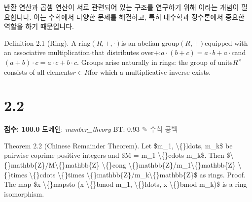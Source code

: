 \documentclass[11pt,a4paper,oneside]{memoir}
\begin{document}
\begin{tcolorbox}[kostyle]
\begin{motivation}
반환 연산과 곱셈 연산이 서로 관련되어 있는 구조를 연구하기 위해 이라는 개념이 필요합니다. 이는 수학에서 다양한 문제를 해결하고, 특히 대수학과 정수론에서 중요한 역할을 하기 때문입니다.
\end{motivation}

Definition 2.1 (Ring). A ring$(R, +, \cdot)$is an abelian group$(R, +)$equipped with an associative multiplication$\cdot$that distributes over$+$:$a \cdot (b + c) = a \cdot b + a \cdot c$and$(a + b) \cdot c = a \cdot c + b \cdot c$. Groups arise naturally in rings: the group of units$R^{\times}$consists of all elements$r \in R$for which a multiplicative inverse exists.


\end{tcolorbox}
\vspace{0.8em}

\section{2.2}
\noindent \textbf{\color{ScoreGreen}점수: 100.0} \quad 도메인: \textit{number\_theory}  \quad \textcolor{ScoreGreen}{BT: 0.93} \quad \textcolor{gray}{\small ✎ 수식 공백}
\vspace{0.4em}

\begin{tcolorbox}[origstyle]
\small Theorem 2.2 (Chinese Remainder Theorem). Let \$m\_1, \textbackslash\{\}ldots, m\_k\$ be pairwise coprime positive integers and \$M = m\_1 \textbackslash\{\}cdots m\_k\$. Then \$\textbackslash\{\}mathbb\{Z\}/M\textbackslash\{\}mathbb\{Z\} \textbackslash\{\}cong \textbackslash\{\}mathbb\{Z\}/m\_1\textbackslash\{\}mathbb\{Z\} \textbackslash\{\}times \textbackslash\{\}cdots \textbackslash\{\}times \textbackslash\{\}mathbb\{Z\}/m\_k\textbackslash\{\}mathbb\{Z\}\$ as rings. Proof. The map \$x \textbackslash\{\}mapsto (x \textbackslash\{\}bmod m\_1, \textbackslash\{\}ldots, x \textbackslash\{\}bmod m\_k)\$ is a ring isomorphism.
\end{tcolorbox}
\vspace{0.3em}
\end{document}
